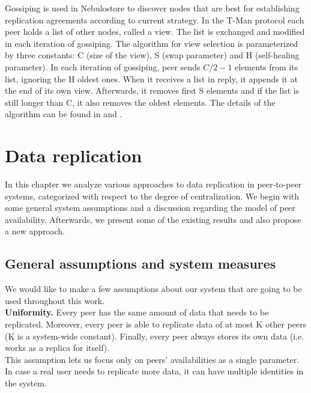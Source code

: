 \documentclass{pracamgren}
\begin{document}
Gossiping is used in Nebulostore to discover nodes that are best for establishing replication agreements according to current strategy. In the T-Man protocol each peer holds a list of other nodes, called a view. The list is exchanged and modified in each iteration of gossiping. The algorithm for view selection is parameterized by three constants: C (size of the view), S (swap parameter) and H (self-healing parameter). In each iteration of gossiping, peer sends $C/2-1$ elements from its list, ignoring the H oldest ones. When it receives a list in reply, it appends it at the end of its own view. Afterwards, it removes first S elements and if the list is still longer than C, it also removes the oldest elements. The details of the algorithm can be found in \cite{gossiping} and \cite{tman}.\\


%
%
%
%

\chapter{Data replication}\label{chap:data_replication}

In this chapter we analyze various approaches to data replication in peer-to-peer systems, categorized with respect to the degree of centralization. We begin with some general system assumptions and a discussion regarding the model of peer availability. Afterwards, we present some of the existing results and also propose a new approach.\\

\section{General assumptions and system measures}\label{assumptions}

We would like to make a few assumptions about our system that are going to be used throughout this work.\\

{\bf Uniformity.} Every peer has the same amount of data that needs to be replicated. Moreover, every peer is able to replicate data of at most K other peers (K is a system-wide constant). Finally, every peer always stores its own data (i.e. works as a replica for itself).\\
This assumption lets us focus only on peers' availabilities as a single parameter. In case a real user needs to replicate more data, it can have multiple identities in the system.\\
\end{document}
